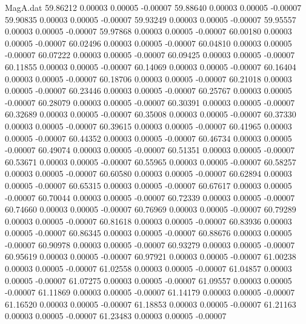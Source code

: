 \begin{filecontents}{MagA.dat}
  59.86212    0.00003    0.00005   -0.00007
  59.88640    0.00003    0.00005   -0.00007
  59.90835    0.00003    0.00005   -0.00007
  59.93249    0.00003    0.00005   -0.00007
  59.95557    0.00003    0.00005   -0.00007
  59.97868    0.00003    0.00005   -0.00007
  60.00180    0.00003    0.00005   -0.00007
  60.02496    0.00003    0.00005   -0.00007
  60.04810    0.00003    0.00005   -0.00007
  60.07222    0.00003    0.00005   -0.00007
  60.09425    0.00003    0.00005   -0.00007
  60.11855    0.00003    0.00005   -0.00007
  60.14069    0.00003    0.00005   -0.00007
  60.16404    0.00003    0.00005   -0.00007
  60.18706    0.00003    0.00005   -0.00007
  60.21018    0.00003    0.00005   -0.00007
  60.23446    0.00003    0.00005   -0.00007
  60.25767    0.00003    0.00005   -0.00007
  60.28079    0.00003    0.00005   -0.00007
  60.30391    0.00003    0.00005   -0.00007
  60.32689    0.00003    0.00005   -0.00007
  60.35008    0.00003    0.00005   -0.00007
  60.37330    0.00003    0.00005   -0.00007
  60.39615    0.00003    0.00005   -0.00007
  60.41965    0.00003    0.00005   -0.00007
  60.44352    0.00003    0.00005   -0.00007
  60.46734    0.00003    0.00005   -0.00007
  60.49074    0.00003    0.00005   -0.00007
  60.51351    0.00003    0.00005   -0.00007
  60.53671    0.00003    0.00005   -0.00007
  60.55965    0.00003    0.00005   -0.00007
  60.58257    0.00003    0.00005   -0.00007
  60.60580    0.00003    0.00005   -0.00007
  60.62894    0.00003    0.00005   -0.00007
  60.65315    0.00003    0.00005   -0.00007
  60.67617    0.00003    0.00005   -0.00007
  60.70044    0.00003    0.00005   -0.00007
  60.72339    0.00003    0.00005   -0.00007
  60.74660    0.00003    0.00005   -0.00007
  60.76969    0.00003    0.00005   -0.00007
  60.79289    0.00003    0.00005   -0.00007
  60.81618    0.00003    0.00005   -0.00007
  60.83936    0.00003    0.00005   -0.00007
  60.86345    0.00003    0.00005   -0.00007
  60.88676    0.00003    0.00005   -0.00007
  60.90978    0.00003    0.00005   -0.00007
  60.93279    0.00003    0.00005   -0.00007
  60.95619    0.00003    0.00005   -0.00007
  60.97921    0.00003    0.00005   -0.00007
  61.00238    0.00003    0.00005   -0.00007
  61.02558    0.00003    0.00005   -0.00007
  61.04857    0.00003    0.00005   -0.00007
  61.07275    0.00003    0.00005   -0.00007
  61.09557    0.00003    0.00005   -0.00007
  61.11869    0.00003    0.00005   -0.00007
  61.14179    0.00003    0.00005   -0.00007
  61.16520    0.00003    0.00005   -0.00007
  61.18853    0.00003    0.00005   -0.00007
  61.21163    0.00003    0.00005   -0.00007
  61.23483    0.00003    0.00005   -0.00007

\end{filecontents}
